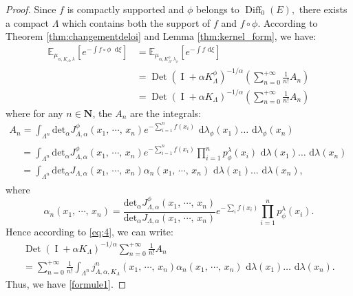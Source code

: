 \documentclass[11pt,a4paper]{amsart}
\begin{document}
\begin{proof}
  Since $f$ is compactly supported and $\phi$ belongs to ${\operatorname{Diff}}_0(E),$
  there exists a compact $\Lambda$ which contains both the support of
  $f$ and $f\circ \phi$.  According to Theorem
  \ref{thm:changementdeloi} and Lemma \ref{thm:kernel_form}, we have:
  \begin{align*}
    {{\mathbb E}}_{\mu_{\alpha,K_{\Lambda},\lambda}} \left[ e^{- \int{f\circ
          \phi\ {\text{ d}}\xi}} \right]
    &={{\mathbb E}}_{\mu_{\alpha,K_{\Lambda}^{\phi},\lambda_{\phi}}} \left[ e^{- \int{f {\text{ d}}\xi}}    \right]\\
    &={\operatorname{Det}}\left( {\operatorname{I}}+\alpha K_{\Lambda}^{\phi}\right)^{-1/\alpha}\left(\sum_{n=0}^{+\infty}\frac{1}{n!}A_n\right)\\
    &={\operatorname{Det}}\left( {\operatorname{I}}+\alpha
      K_{\Lambda}\right)^{-1/\alpha}\left(\sum_{n=0}^{+\infty}\frac{1}{n!}A_n\right)
  \end{align*}
  where for any $n \in {{\mathbf N}}$, the $A_n$ are the integrals:
  \begin{multline*}
    A_n=\int_{\Lambda^n}
    {{{\text{det}}}_{\alpha}J_{\Lambda,\alpha}^{\phi}(x_1,\, \cdots,\, x_n)
      e^{-\sum_{i=1}^n f(x_i)}{\text{ d}}\lambda_{\phi}(x_1)\ldots{\text{ d}}\lambda_{\phi}(x_n)} \\
    \begin{aligned}
      &=\int_{\Lambda^n}
      {{{\text{det}}}_{\alpha}J^{\phi}_{\Lambda,\alpha}(x_1,\, \cdots,\, x_n)
        e^{-\sum_{i=1}^n f(x_i)} \prod_{i=1}^{n}p^{\lambda}_{\phi}(x_i){\text{ d}}\lambda(x_1)\ldots {\text{ d}}\lambda(x_n)}\\
      &=\int_{\Lambda^n}{{\text{det}}}_{\alpha}J_{\Lambda,\alpha}(x_1,\,
      \cdots,\, x_n) \alpha_n(x_1,\, \cdots,\,
      x_n){\text{ d}}\lambda(x_1)\ldots {\text{ d}}\lambda(x_n) ,
    \end{aligned}
  \end{multline*}
  where
  \begin{equation*}
    \alpha_n(x_1,\, \cdots,\, x_n)=\frac{{{\text{det}}}_{\alpha}J_{\Lambda,\alpha}^{\phi}(x_1,\, \cdots,\, x_n)}{{{\text{det}}}_{\alpha}J_{\Lambda,\alpha}(x_1,\, \cdots,\, x_n)} e^{-\sum_{i}f(x_i)} \prod_{i=1}^{n}p^{\lambda}_{\phi}(x_i).
  \end{equation*}
  Hence according to \eqref{eq:4}, we can write:
  \begin{multline*}
    {\operatorname{Det}}\left( {\operatorname{I}}+\alpha K_{\Lambda}\right)^{-1/\alpha}\sum_{n=0}^{+\infty}\frac{1}{n!}A_n\\
    =\sum_{n=0}^{+\infty}\frac{1}{n!}
    \int_{\Lambda^n}j^n_{\Lambda,\alpha,K_{\Lambda}}(x_1,\, \cdots,\,
    x_n)\alpha_n(x_1,\, \cdots,\, x_n){\text{ d}}\lambda(x_1)\ldots
    {\text{ d}}\lambda(x_n).
  \end{multline*}
  Thus, we have \eqref{formule1}.
\end{proof}
\end{document}
